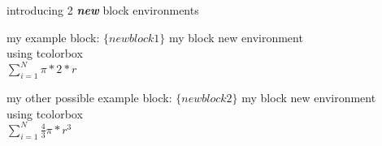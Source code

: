 \documentclass{beamer}
\begin{document}
\begin{frame}{introducing 2 \textbf{\emph{new}} block environments}
\begin{newblock1}{my example block:  $\{newblock1\}$}
    my block new environment\\
    using tcolorbox\\
    $\sum^N_{i=1}\pi * 2 * r$
\end{newblock1}
\begin{newblock2}{my other possible example block:  $\{newblock2\}$}
    my block new environment\\
    using tcolorbox\\
    $\sum^N_{i=1}\frac{4}{3}\pi * r^3$ 
   
\end{newblock2}

\end{frame}




\end{document}
